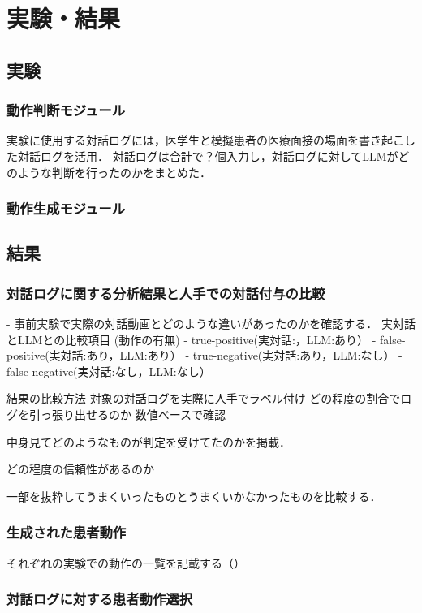 \section{実験・結果}\label{result}

\subsection{実験}
\subsubsection*{動作判断モジュール}
実験に使用する対話ログには，医学生と模擬患者の医療面接の場面を書き起こした対話ログを活用．
対話ログは合計で？個入力し，対話ログに対してLLMがどのような判断を行ったのかをまとめた．

\subsubsection*{動作生成モジュール}

\subsection{結果}
\subsubsection*{対話ログに関する分析結果と人手での対話付与の比較}
- 事前実験で実際の対話動画とどのような違いがあったのかを確認する．
実対話とLLMとの比較項目  (動作の有無)
- true-positive(実対話:，LLM:あり）
- false-positive(実対話:あり，LLM:あり）
- true-negative(実対話:あり，LLM:なし）
- false-negative(実対話:なし，LLM:なし）

結果の比較方法
対象の対話ログを実際に人手でラベル付け
どの程度の割合でログを引っ張り出せるのか
数値ベースで確認

中身見てどのようなものが判定を受けてたのかを掲載．

どの程度の信頼性があるのか




一部を抜粋してうまくいったものとうまくいかなかったものを比較する．

\subsubsection*{生成された患者動作}
それぞれの実験での動作の一覧を記載する（）


\subsubsection*{対話ログに対する患者動作選択}
